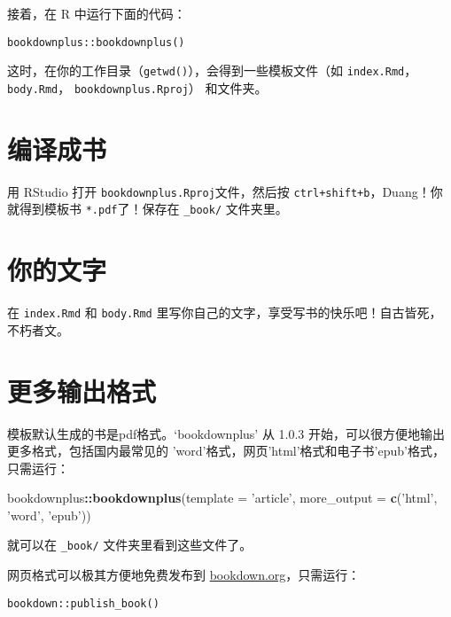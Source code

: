 \documentclass[doublesided]{Style/ucasthesis}%
\newenvironment{Shaded}{\begin{snugshade}}{\end{snugshade}}
\newcommand{\KeywordTok}[1]{\textcolor[rgb]{0.13,0.29,0.53}{\textbf{{#1}}}}
\newcommand{\DataTypeTok}[1]{\textcolor[rgb]{0.13,0.29,0.53}{{#1}}}
\newcommand{\StringTok}[1]{\textcolor[rgb]{0.31,0.60,0.02}{{#1}}}
\newcommand{\OperatorTok}[1]{\textcolor[rgb]{0.81,0.36,0.00}{\textbf{{#1}}}}
\newcommand{\NormalTok}[1]{{#1}}
\begin{document}
接着，在 R 中运行下面的代码：

\begin{verbatim}
bookdownplus::bookdownplus()
\end{verbatim}

这时，在你的工作目录（\texttt{getwd()}），会得到一些模板文件（如 \texttt{index.Rmd}，\texttt{body.Rmd}， \texttt{bookdownplus.Rproj}） 和文件夹。

\hypertarget{section-5}{%
\section{编译成书}\label{section-5}}

用 RStudio 打开 \texttt{bookdownplus.Rproj}文件，然后按 \texttt{ctrl+shift+b}，Duang！你就得到模板书 \texttt{*.pdf}了！保存在 \texttt{\_book/} 文件夹里。

\hypertarget{section-6}{%
\section{你的文字}\label{section-6}}

在 \texttt{index.Rmd} 和 \texttt{body.Rmd} 里写你自己的文字，享受写书的快乐吧！自古皆死，不朽者文。

\hypertarget{section-7}{%
\section{更多输出格式}\label{section-7}}

模板默认生成的书是pdf格式。`bookdownplus' 从 1.0.3 开始，可以很方便地输出更多格式，包括国内最常见的 'word'格式，网页'html'格式和电子书'epub'格式，只需运行：

\begin{Shaded}
\begin{Highlighting}[]
\NormalTok{bookdownplus}\OperatorTok{::}\KeywordTok{bookdownplus}\NormalTok{(}\DataTypeTok{template =} \StringTok{'article'}\NormalTok{, }
    \DataTypeTok{more_output =} \KeywordTok{c}\NormalTok{(}\StringTok{'html'}\NormalTok{, }\StringTok{'word'}\NormalTok{, }\StringTok{'epub'}\NormalTok{))}
\end{Highlighting}
\end{Shaded}

就可以在 \texttt{\_book/} 文件夹里看到这些文件了。

网页格式可以极其方便地免费发布到 \href{https://bookdown.org}{bookdown.org}，只需运行：

\begin{verbatim}
bookdown::publish_book()
\end{verbatim}
\end{document}
